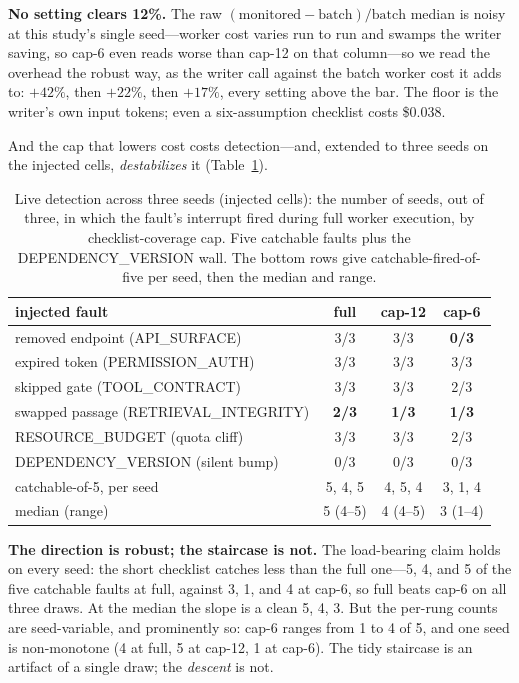 \documentclass[acmsmall,screen]{acmart}
\begin{document}
\textbf{No setting clears 12\%.} The raw
$(\mathrm{monitored}-\mathrm{batch})/\mathrm{batch}$ median is noisy at this
study's single seed---worker cost varies run to run and swamps the writer
saving, so cap-6 even reads worse than cap-12 on that column---so we read the
overhead the robust way, as the writer call against the batch worker cost it adds
to: $+42\%$, then $+22\%$, then $+17\%$, every setting above the bar. The floor is
the writer's own input tokens; even a six-assumption checklist costs \$0.038.

And the cap that lowers cost costs detection---and, extended to three seeds on
the injected cells, \emph{destabilizes} it (Table~\ref{tab:v3-detection}).

\begin{table}[t]
\caption{Live detection across three seeds (injected cells): the number of seeds,
out of three, in which the fault's interrupt fired during full worker execution,
by checklist-coverage cap. Five catchable faults plus the DEPENDENCY\_VERSION
wall. The bottom rows give catchable-fired-of-five per seed, then the median and
range.}
\label{tab:v3-detection}
\begin{tabular}{lccc}
\toprule
injected fault & full & cap-12 & cap-6 \\
\midrule
removed endpoint (API\_SURFACE)        & 3/3 & 3/3 & \textbf{0/3} \\
expired token (PERMISSION\_AUTH)       & 3/3 & 3/3 & 3/3 \\
skipped gate (TOOL\_CONTRACT)          & 3/3 & 3/3 & 2/3 \\
swapped passage (RETRIEVAL\_INTEGRITY) & \textbf{2/3} & \textbf{1/3} & \textbf{1/3} \\
RESOURCE\_BUDGET (quota cliff)         & 3/3 & 3/3 & 2/3 \\
DEPENDENCY\_VERSION (silent bump)      & 0/3 & 0/3 & 0/3 \\
\midrule
catchable-of-5, per seed & 5, 4, 5 & 4, 5, 4 & 3, 1, 4 \\
\quad median (range)     & 5 (4--5) & 4 (4--5) & 3 (1--4) \\
\bottomrule
\end{tabular}
\end{table}

\textbf{The direction is robust; the staircase is not.} The load-bearing claim
holds on every seed: the short checklist catches less than the full one---5, 4,
and 5 of the five catchable faults at full, against 3, 1, and 4 at cap-6, so full
beats cap-6 on all three draws. At the median the slope is a clean 5, 4, 3. But
the per-rung counts are seed-variable, and prominently so: cap-6 ranges from 1 to
4 of 5, and one seed is non-monotone (4 at full, 5 at cap-12, 1 at cap-6). The
tidy staircase is an artifact of a single draw; the \emph{descent} is not.
\end{document}
